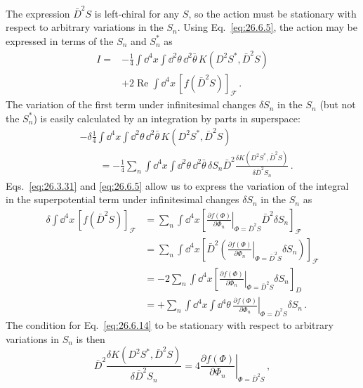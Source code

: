 The expression \(\bar D^2S\) is left-chiral for any \(S\), so the action
must be stationary with respect to arbitrary variations in the \(S_n\). Using
Eq.~\eqref{eq:26.6.5}, the action may be expressed in terms of the \(S_n\) and
\(S_n^*\) as
\begin{equation}
  \begin{aligned}
  I={}&-\frac14\int \dd^4x\int \dd^2\theta\,\dd^2\bar\theta\,
  K(D^2S^*,\bar D^2S)
  \\
  &+2\operatorname{Re}\int \dd^4x\,
  [f(\bar D^2S)]_{\mathcal{F}}\,.
  \end{aligned}
  \tag{26.6.14}\label{eq:26.6.14}
\end{equation}
The variation of the first term under infinitesimal changes \(\delta S_n\) in
the \(S_n\) (but not the \(S_n^*\)) is easily calculated by an integration by
parts in superspace:
\[
  \begin{aligned}
  &-\delta\frac14\int \dd^4x\int \dd^2\theta\,\dd^2\bar\theta\,
    K(D^2S^*,\bar D^2S)
  \\
  &\qquad=-\frac14\sum_n\int \dd^4x\int \dd^2\theta\,\dd^2\bar\theta\,
    \delta S_n\bar D^2
    \frac{\delta K(D^2S^*,\bar D^2S)}
         {\delta\bar D^2S_n}\,.
  \end{aligned}
\]
Eqs.~\eqref{eq:26.3.31} and \eqref{eq:26.6.5} allow us to express the
variation of the integral in the superpotential term under infinitesimal
changes \(\delta S_n\) in the \(S_n\) as
\[
  \begin{aligned}
  \delta\int \dd^4x\,[f(\bar D^2S)]_{\mathcal{F}}
  &=
  \sum_n\int \dd^4x
  \left[
    \left.
    \frac{\partial f(\Phi)}{\partial\Phi_n}
    \right|_{\Phi=\bar D^2S}
    \bar D^2\delta S_n
  \right]_{\mathcal{F}}
  \\
  &=
  \sum_n\int \dd^4x
  \left[
    \bar D^2\left(
      \left.
      \frac{\partial f(\Phi)}{\partial\Phi_n}
      \right|_{\Phi=\bar D^2S}
      \delta S_n
    \right)
  \right]_{\mathcal{F}}
  \\
  &=-2\sum_n\int \dd^4x
  \left[
    \left.
    \frac{\partial f(\Phi)}{\partial\Phi_n}
      \right|_{\Phi=\bar D^2S}
    \delta S_n
  \right]_D
  \\
  &=+\sum_n\int \dd^4x\int \dd^4\theta\,
    \left.
    \frac{\partial f(\Phi)}{\partial\Phi_n}
    \right|_{\Phi=\bar D^2S}
    \delta S_n\,.
  \end{aligned}
\]
The condition for Eq.~\eqref{eq:26.6.14} to be stationary with respect to
arbitrary variations in \(S_n\) is then
\[
  \bar D^2
  \frac{\delta K(D^2S^*,\bar D^2S)}
       {\delta\bar D^2S_n}
  =4
  \left.
  \frac{\partial f(\Phi)}{\partial\Phi_n}
  \right|_{\Phi=\bar D^2S}\,,
\]
